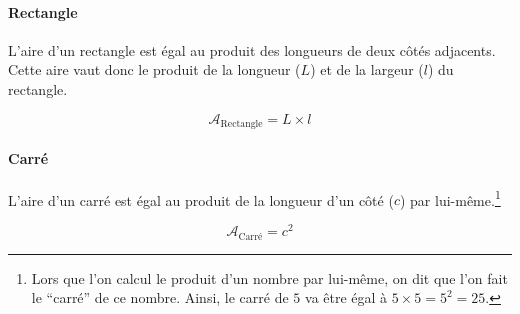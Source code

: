 \documentclass[a4paper, twoside]{article}
\begin{document}
\vspace*{-0.25cm}

\paragraph*{Rectangle}

L'aire d'un rectangle est égal au produit des longueurs de deux
côtés adjacents. Cette aire vaut donc le produit de la
longueur ($L$) et de la largeur ($l$) du rectangle.

$$\mathcal{A}_{\text{Rectangle}} = L \times l$$

\vspace*{-0.25cm}

\paragraph*{Carré}

L'aire d'un carré est égal au produit de la longueur d'un côté
($c$) par lui-même.\footnote{Lors que l'on calcul le produit d'un nombre
	par lui-même, on dit que l'on fait le “carré” de ce nombre.
	Ainsi, le carré de $5$ va être égal à $5 \times 5 = 5^{2} = 25$.}

$$\mathcal{A}_{\text{Carré}} = c^{2}$$

\newlength{\hauteurImage}
\setlength{\hauteurImage}{3.5cm}
\end{document}
